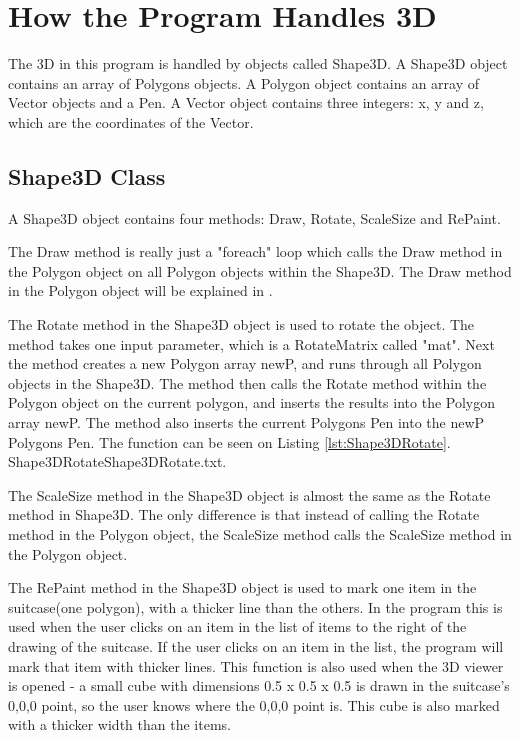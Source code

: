 \section{How the Program Handles 3D}
\label{3DHandler}
The 3D in this program is handled by objects called Shape3D. A Shape3D object contains an array of Polygons objects. A Polygon object contains an array of Vector objects and a Pen. A Vector object contains three integers: x, y and z, which are the coordinates of the Vector. 

\subsection{Shape3D Class}
A Shape3D object contains four methods: Draw, Rotate, ScaleSize and RePaint.

The Draw method is really just a "foreach" loop which calls the Draw method in the Polygon object on all Polygon objects within the Shape3D. The Draw method in the Polygon object will be explained in .

The Rotate method in the Shape3D object is used to rotate the object. The method takes one input parameter, which is a RotateMatrix called "mat". Next the method creates a new Polygon array newP, and runs through all Polygon objects in the Shape3D. The method then calls the Rotate method within the Polygon object on the current polygon, and inserts the results into the Polygon array newP. The method also inserts the current Polygons Pen into the newP Polygons Pen. The function can be seen on Listing \ref{lst:Shape3DRotate}.
 {Shape3DRotate}{Shape3DRotate.txt}.

The ScaleSize method in the Shape3D object is almost the same as the Rotate method in Shape3D. The only difference is that instead of calling the Rotate method in the Polygon object, the ScaleSize method calls the ScaleSize method in the Polygon object.

The RePaint method in the Shape3D object is used to mark one item in the suitcase(one polygon), with a thicker line than the others. In the program this is used when the user clicks on an item in the list of items to the right of the drawing of the suitcase. If the user clicks on an item in the list, the program will mark that item with thicker lines. This function is also used when the 3D viewer is opened - a small cube with dimensions 0.5 x 0.5 x 0.5 is drawn in the suitcase's 0,0,0 point, so the user knows where the 0,0,0 point is. This cube is also marked with a thicker width than the items.

